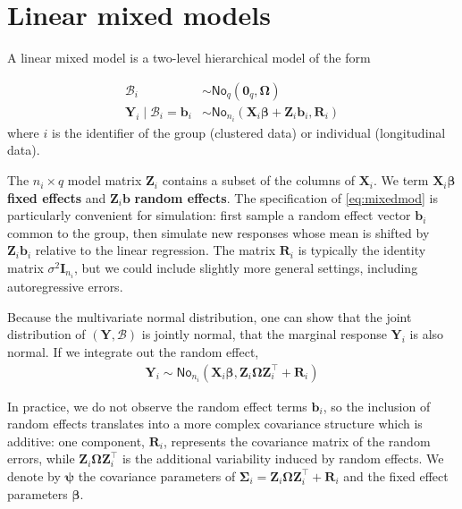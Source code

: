 \documentclass[
  11pt,
  letterpaper,
]{book}
\theoremstyle{definition}
\theoremstyle{definition}
\theoremstyle{definition}
\theoremstyle{definition}
\theoremstyle{remark}
\begin{document}
\hypertarget{linear-mixed-models}{%
\chapter{Linear mixed models}\label{linear-mixed-models}}

A linear mixed model is a two-level hierarchical model of the form

\begin{align}
\mathcal{B}_i &\sim \mathsf{No}_q(\boldsymbol{0}_q, \boldsymbol{\Omega}) \nonumber\\
\boldsymbol{Y}_i \mid \mathcal{B}_i=\boldsymbol{b}_i &\sim \mathsf{No}_{n_i}(\mathbf{X}_i\boldsymbol{\beta} + \mathbf{Z}_i\boldsymbol{b}_i, \mathbf{R}_i) \label{eq:mixedmod}
\end{align}
where \(i\) is the identifier of the group (clustered data) or individual (longitudinal data).

The \(n_i \times q\) model matrix \(\mathbf{Z}_i\) contains a subset of the columns of \(\mathbf{X}_i\). We term \(\mathbf{X}_i\boldsymbol{\beta}\) \textbf{fixed effects} and \(\mathbf{Z}_i\boldsymbol{b}\) \textbf{random effects}.
The specification of \eqref{eq:mixedmod} is particularly convenient for simulation: first sample a random effect vector \(\boldsymbol{b}_i\) common to the group, then simulate new responses whose mean is shifted by \(\mathbf{Z}_i\boldsymbol{b}_i\) relative to the linear regression. The matrix \(\mathbf{R}_i\) is typically the identity matrix \(\sigma^2\mathbf{I}_{n_i}\), but we could include slightly more general settings, including autoregressive errors.

Because the multivariate normal distribution, one can show that the joint distribution of \((\boldsymbol{Y}, \mathcal{B})\) is jointly normal, that the marginal response \(\boldsymbol{Y}_i\) is also normal. If we integrate out the random effect,
\begin{align}
\boldsymbol{Y}_i \sim \mathsf{No}_{n_i}( \mathbf{X}_i \boldsymbol{\beta}, \mathbf{Z}_i\boldsymbol{\Omega}\mathbf{Z}_i^\top + \mathbf{R}_i)  \label{eq:margmodmixed}
\end{align}

In practice, we do not observe the random effect terms \(\boldsymbol{b}_i\), so the inclusion of random effects translates into a more complex covariance structure which is additive: one component, \(\mathbf{R}_i\), represents the covariance matrix of the random errors, while \(\mathbf{Z}_i\boldsymbol{\Omega}\mathbf{Z}_i^\top\) is the additional variability induced by random effects. We denote by \(\boldsymbol{\psi}\) the covariance parameters of \(\boldsymbol{\Sigma}_i= \mathbf{Z}_i\boldsymbol{\Omega}\mathbf{Z}_i^\top + \mathbf{R}_i\) and the fixed effect parameters \(\boldsymbol{\beta}\).
\end{document}
